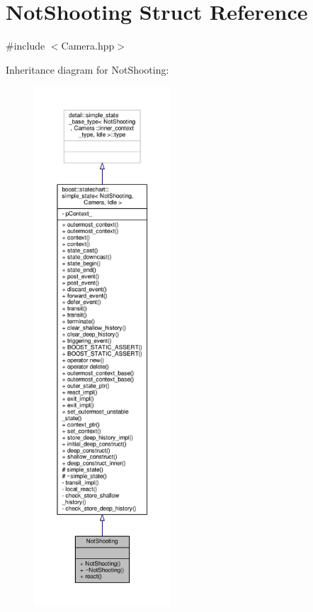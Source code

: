\hypertarget{struct_not_shooting}{}\section{Not\+Shooting Struct Reference}
\label{struct_not_shooting}


{\ttfamily \#include $<$Camera.\+hpp$>$}



Inheritance diagram for Not\+Shooting\+:
\nopagebreak
\begin{figure}[H]
\begin{center}
\leavevmode
\includegraphics[height=550pt]{struct_not_shooting__inherit__graph}
\end{center}
\end{figure}


